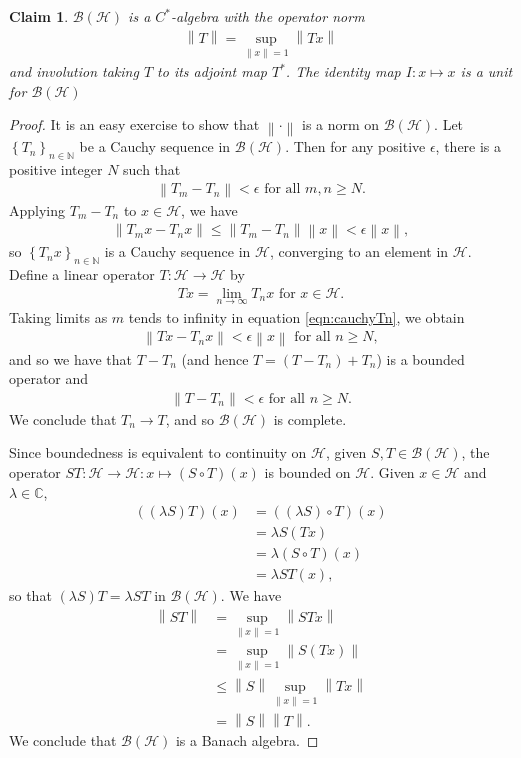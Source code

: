 \documentclass[11pt,a4paper]{report}
\theoremstyle{plain}
\newtheorem*{claim}{Claim}
\theoremstyle{definition}
\newcommand{\1}{\mathbbm{1}}
\newcommand{\C}{\mathbb{C}}
\newcommand{\N}{\mathbb{N}}
\renewcommand{\H}{\mathcal{H}}
\newcommand{\B}{\mathcal{B}}
\newcommand{\BH}{\mathcal{\B(\H)}}
\begin{document}
\begin{claim} $\B(\H)$ is a $C^\ast$-algebra with the operator norm 
\begin{align*}
	\left\|T\right\|= \sup_{\left\|x\right\|=1}{\left\|Tx\right\|}
\end{align*}
and involution taking $T$ to its adjoint map $T^\ast$. 
The identity map $I:x\mapsto x$ is a unit for $\BH$
\end{claim}
\begin{proof}
	It is an easy exercise to show that $\left\|\cdot\right\|$ is a norm on $\BH$. Let $\left\{T_n\right\}_{n\in\N}$ be a 
	Cauchy sequence in $\BH$. Then for any positive $\epsilon$, there is a positive integer $N$ such 
	that 
	\begin{align*}
		\left\|T_m-T_n\right\| < \epsilon \mbox{ for all } m,n \geq N.
	\end{align*}
	Applying $T_m-T_n$ to $x \in \H$, we have 
	\begin{align}\label{eqn:cauchyTn}
		\left\|T_mx-T_nx\right\| \leq \left\|T_m-T_n\right\| \left\|x\right\| < \epsilon \left\|x\right\|,
	\end{align}
	so $\left\{T_n x\right\}_{n\in\N}$ is a Cauchy sequence in $\H$, converging to an element in $\H$.
	Define a linear operator $T:\H \to \H$ by 
	\begin{align*}
		Tx= \lim_{n\to\infty}{T_nx} \mbox{ for } x \in \H.
	\end{align*}
	Taking limits as $m$ tends to infinity in equation \eqref{eqn:cauchyTn}, we obtain
	\begin{align*}
		\left\|Tx-T_nx\right\| < \epsilon \left\|x\right\| \mbox{ for all }n \geq N,
	\end{align*}
	and so we have that $T-T_n$ (and hence $T=(T-T_n)+T_n$) is a bounded operator and  
	\begin{align*}
		\left\|T-T_n\right\| <\epsilon \mbox{ for all }n \geq N.
	\end{align*}
	We conclude that $T_n \to T$, and so $\BH$ is complete.
	
	Since boundedness is equivalent to continuity on $\H$, given $S,T\in\BH$, the operator 
	$ST:\H \to \H: x \mapsto (S\circ T)(x)$ is bounded on $\H$.
	Given $x\in\H$ and $\lambda\in\C$, 
	\begin{align*}
			((\lambda S)T)(x)
		&=	((\lambda S)\circ T)(x)												\\
		&=	\lambda S(Tx)														\\
		&=	\lambda (S\circ T)(x)												\\
		&=	\lambda ST(x),
	\end{align*} 
	so that $(\lambda S)T = \lambda ST$ in $\BH$. We have 
	\begin{align*}
				\left\|ST\right\|
		&=		\sup_{\left\|x\right\|=1}{\left\|STx\right\|} 									\\
		&=		\sup_{\left\|x\right\|=1}{\left\|S(Tx)\right\|} 								\\
		&\leq	\left\|S\right\| \sup_{\left\|x\right\|=1}{\left\|Tx\right\|} 					\\
		&=		\left\|S\right\| \left\|T\right\|.
	\end{align*}
	We conclude that $\BH$ is a Banach algebra.
	

\end{proof}
\end{document}
